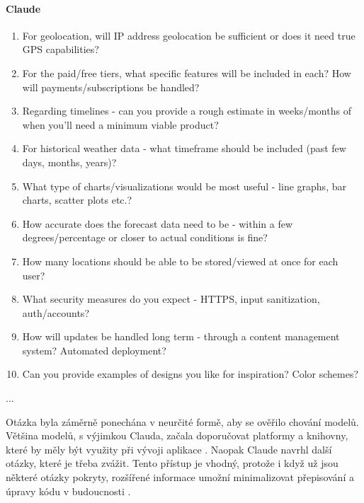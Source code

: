 \documentclass[FM,DP]{tulthesis}
\begin{document}
\begin{tcolorbox}[colback=white,colframe=black]
			\paragraph{Claude}
			\begin{enumerate}
				\item For geolocation, will IP address geolocation be sufficient or does it need true GPS capabilities?
				\item For the paid/free tiers, what specific features will be included in each? How will payments/subscriptions be handled?
				\item Regarding timelines - can you provide a rough estimate in weeks/months of when you'll need a minimum viable product?
				\item For historical weather data - what timeframe should be included (past few days, months, years)?
				\item What type of charts/visualizations would be most useful - line graphs, bar charts, scatter plots etc.?
				\item How accurate does the forecast data need to be - within a few degrees/percentage or closer to actual conditions is fine?
				\item How many locations should be able to be stored/viewed at once for each user?
				\item What security measures do you expect - HTTPS, input sanitization, auth/accounts?
				\item How will updates be handled long term - through a content management system? Automated deployment?
				\item Can you provide examples of designs you like for inspiration? Color schemes? 
			\end{enumerate} 
			... \cite{claude_analyza}
		\end{tcolorbox}
		\vspace{0.6em}
		
		Otázka byla záměrně ponechána v neurčité formě, aby se ověřilo chování modelů. Většina modelů, s výjimkou Clauda, začala doporučovat platformy a knihovny, které by měly být využity při vývoji aplikace \cite{bard_analyza} \cite{bingCopilot_analyza} \cite{chatgpt_analyza} \cite{codellama_analyza} \cite{gitCopilot_analyza}. Naopak Claude navrhl další otázky, které je třeba zvážit. Tento přístup je vhodný, protože i když už jsou některé otázky pokryty, rozšířené informace umožní minimalizovat přepisování a úpravy kódu v budoucnosti \cite{claude_analyza}.
		
\end{document}
